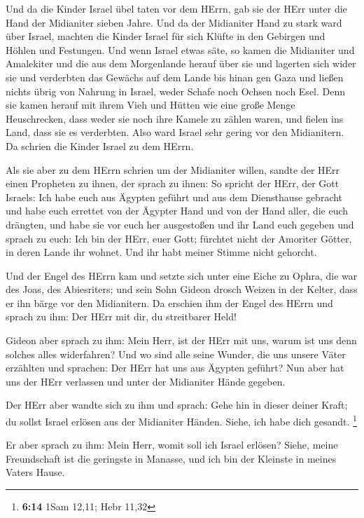  Und da die Kinder Israel übel taten vor dem HErrn, gab sie
der HErr unter die Hand der Midianiter sieben Jahre.  Und da
der Midianiter Hand zu stark ward über Israel, machten die Kinder Israel
für sich Klüfte in den Gebirgen und Höhlen und Festungen. 
Und wenn Israel etwas säte, so kamen die Midianiter und Amalekiter und
die aus dem Morgenlande herauf über sie  und lagerten sich
wider sie und verderbten das Gewächs auf dem Lande bis hinan gen Gaza
und ließen nichts übrig von Nahrung in Israel, weder Schafe noch Ochsen
noch Esel.  Denn sie kamen herauf mit ihrem Vieh und Hütten
wie eine große Menge Heuschrecken, dass weder sie noch ihre Kamele zu
zählen waren, und fielen ins Land, dass sie es verderbten. 
Also ward Israel sehr gering vor den Midianitern. Da schrien die Kinder
Israel zu dem HErrn.

 Als sie aber zu dem HErrn schrien um der Midianiter willen,
 sandte der HErr einen Propheten zu ihnen, der sprach zu
ihnen: So spricht der HErr, der Gott Israels: Ich habe euch aus Ägypten
geführt und aus dem Diensthause gebracht  und habe euch
errettet von der Ägypter Hand und von der Hand aller, die euch drängten,
und habe sie vor euch her ausgestoßen und ihr Land euch gegeben
 und sprach zu euch: Ich bin der HErr, euer Gott; fürchtet
nicht der Amoriter Götter, in deren Lande ihr wohnet. Und ihr habt
meiner Stimme nicht gehorcht.

 Und der Engel des HErrn kam und setzte sich unter eine
Eiche zu Ophra, die war des Joas, des Abiesriters; und sein Sohn Gideon
drosch Weizen in der Kelter, dass er ihn bärge vor den Midianitern.
 Da erschien ihm der Engel des HErrn und sprach zu ihm: Der
HErr mit dir, du streitbarer Held!

 Gideon aber sprach zu ihm: Mein Herr, ist der HErr mit
uns, warum ist uns denn solches alles widerfahren? Und wo sind alle
seine Wunder, die uns unsere Väter erzählten und sprachen: Der HErr hat
uns aus Ägypten geführt? Nun aber hat uns der HErr verlassen und unter
der Midianiter Hände gegeben.

 Der HErr aber wandte sich zu ihm und sprach: Gehe hin in
dieser deiner Kraft; du sollst Israel erlösen aus der Midianiter Händen.
Siehe, ich habe dich gesandt. \footnote{\textbf{6:14} 1Sam 12,11; Hebr
  11,32}

 Er aber sprach zu ihm: Mein Herr, womit soll ich Israel
erlösen? Siehe, meine Freundschaft ist die geringste in Manasse, und ich
bin der Kleinste in meines Vaters Hause.

